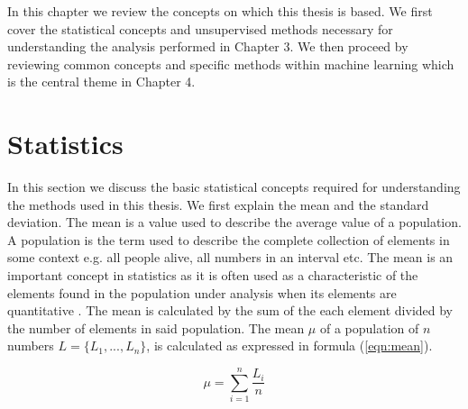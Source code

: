 In this chapter we review the concepts on which this thesis is based. We first cover the statistical concepts and unsupervised methods necessary for understanding the analysis performed in Chapter 3. We then proceed by reviewing common concepts and specific methods within machine learning which is the central theme in Chapter 4.%


\section{Statistics}

In this section we discuss the basic statistical concepts required for understanding the methods used in this thesis. We first explain the mean and the standard deviation. The mean is a value used to describe the average value of a population. A population is the term used to describe the complete collection of elements in some context e.g. all people alive, all numbers in an interval etc. The mean is an important concept in statistics as it is often used as a characteristic of the elements found in the population under analysis when its elements are quantitative \cite{rowntree1981statistics}. The mean is calculated by the sum of the each element divided by the number of elements in said population. The mean $\mu$ of a population of $n$ numbers $L = \{L_1, ..., L_n\}$, is calculated as expressed in formula (\ref{eqn:mean}).

\begin{equation}
\label{eqn:mean}
\mu = \sum_{i=1}^n \frac{L_i}{n}
\end{equation}

